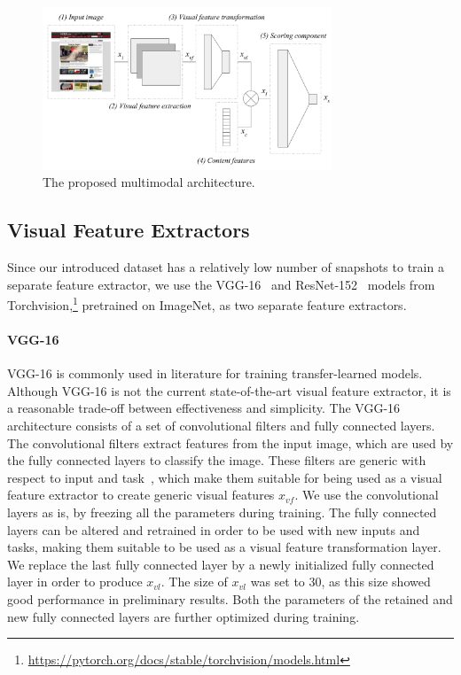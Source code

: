 

\begin{figure}[t]
\includegraphics[width = 3.4in]{images/multimodelarchitecture.pdf}
\caption{The proposed multimodal architecture.}
\label{fig:multimodelarchitecture}
\end{figure}

\subsection{Visual Feature Extractors} \label{sec:visualfeatures}
Since our introduced \datasetname{} data\-set has a relatively low number of snapshots to train a separate feature extractor, we use the VGG-16~\cite{simonyan2014very} and ResNet-152~\cite{he2016deep} models from Torchvision,\footnote{\url{https://pytorch.org/docs/stable/torchvision/models.html}} pretrained on ImageNet, as two separate feature extractors. 
\paragraph{VGG-16}
VGG-16 is commonly used in literature for training transfer-learned models. 
Although VGG-16 is not the current state-of-the-art visual feature extractor, it is a reasonable trade-off between effectiveness and simplicity.
The VGG-16 architecture consists of a set of convolutional filters and fully connected layers. 
The convolutional filters extract features from the input image, which are used by the fully connected layers to classify the image. 
These filters are generic with respect to input and task~\citep{donahue2014decaf}, which make them suitable for being used as a visual feature extractor to create generic visual features $x_{vf}$. We use the convolutional layers as is, by freezing all the parameters during training. The fully connected layers can be altered and retrained in order to be used with new inputs and tasks, making them suitable to be used as a visual feature transformation layer. We replace the last fully connected layer by a newly initialized fully connected layer in order to produce $x_{vl}$. The size of $x_{vl}$ was set to $30$, as this size showed good performance in preliminary results.
Both the parameters of the retained and new fully connected layers are further optimized during training.


